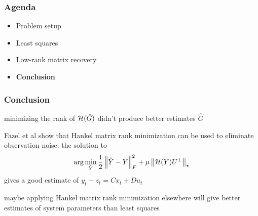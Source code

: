 \begin{frame}
\frametitle{Agenda}
\begin{itemize}
\item Problem setup
\item Least squares
\item Low-rank matrix recovery
\item \textbf{Conclusion}
\end{itemize}
\end{frame}

\begin{frame}
\frametitle{Conclusion}
minimizing the rank of $\mathcal{H}(\hat G)$
didn't produce better estimates $\hat G$

Fazel et al show that Hankel matrix rank minimization
can be used to eliminate observation noise:
the solution to
\[ \arg\min _{\hat Y} \frac{1}{2} \left\Vert{\hat Y - Y}\right\Vert_F^2 + \mu \left\Vert{\mathcal{H}(Y) U^\bot}\right\Vert_\star \]
gives a good estimate of $y_t - z_t = C x_t + D u_t$

maybe applying Hankel matrix rank minimization elsewhere
will give better estimates of system parameters than least squares
\end{frame}
